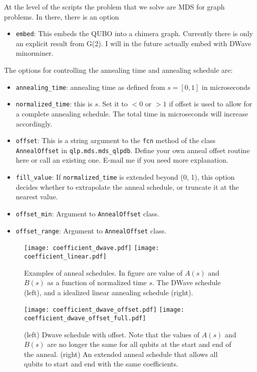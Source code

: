 \documentclass[]{article}
\begin{document}
At the level of the scripts the problem that we solve are MDS for graph problems. In there, there is an option
\begin{itemize}
	\item \texttt{embed}: This embeds the QUBO into a chimera graph. Currently there is only an explicit result from G(2). I will in the future actually embed with DWave minorminer.
\end{itemize}

The options for controlling the annealing time and annealing schedule are:
\begin{itemize}
	\item \texttt{annealing\_time}: annealing time as defined from $s=[0, 1]$ in microseconds
	\item \texttt{normalized\_time}: this is $s$. Set it to $<0$ or $>1$ if offset is used to allow for a complete annealing schedule. The total time in microseconds will increase accordingly.
	\item \texttt{offset}: This is a string argument to the \texttt{fcn} method of the class \texttt{AnnealOffset} in \texttt{qlp.mds.mds\_qlpdb}. Define your own anneal offset routine here or call an existing one. E-mail me if you need more explanation.
	\item \texttt{fill\_value}: If \texttt{normalized\_time} is extended beyond (0, 1), this option decides whether to extrapolate the anneal schedule, or truncate it at the nearest value.
	\item \texttt{offset\_min}: Argument to \texttt{AnnealOffset} class.
	\item \texttt{offset\_range}: Argument to \texttt{AnnealOffset} class.
\end{itemize}

\begin{figure}[htb]
	\centering
	\texttt{[image: coefficient\_dwave.pdf]}
	\texttt{[image: coefficient\_linear.pdf]}
	\caption{\label{fig:anneal_schedules} Examples of anneal schedules. In figure are value of $A(s)$ and $B(s)$ as a function of normalized time $s$. The DWave schedule (left), and a idealized linear annealing schedule (right).
	}
\end{figure}

\begin{figure}[htb]
	\centering
	\texttt{[image: coefficient\_dwave\_offset.pdf]}
	\texttt{[image: coefficient\_dwave\_offset\_full.pdf]}
	\caption{\label{fig:anneal_offset} (left) Dwave schedule with offset. Note that the values of $A(s)$ and $B(s)$ are no longer the same for all qubits at the start and end of the anneal. (right) An extended anneal schedule that allows all qubits to start and end with the same coefficients.
	}
\end{figure}
\end{document}
